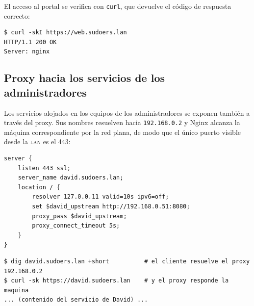 
El acceso al portal se verifica con \texttt{curl}, que devuelve el c\'odigo
de respuesta correcto:

\begin{lstlisting}[style=terminal]
$ curl -skI https://web.sudoers.lan
HTTP/1.1 200 OK
Server: nginx
\end{lstlisting}


\subsection{Proxy hacia los servicios de los administradores}

Los servicios alojados en los equipos de los administradores se exponen
tambi\'en a trav\'es del proxy. Sus nombres resuelven hacia
\texttt{192.168.0.2} y Nginx alcanza la m\'aquina correspondiente por la red
plana, de modo que el \'unico puerto visible desde la \textsc{lan} es el
443:

\begin{lstlisting}[style=terminal]
server {
    listen 443 ssl;
    server_name david.sudoers.lan;
    location / {
        resolver 127.0.0.11 valid=10s ipv6=off;
        set $david_upstream http://192.168.0.51:8080;
        proxy_pass $david_upstream;
        proxy_connect_timeout 5s;
    }
}
\end{lstlisting}

\begin{lstlisting}[style=terminal]
$ dig david.sudoers.lan +short          # el cliente resuelve el proxy
192.168.0.2
$ curl -sk https://david.sudoers.lan    # y el proxy responde la maquina
... (contenido del servicio de David) ...
\end{lstlisting}


